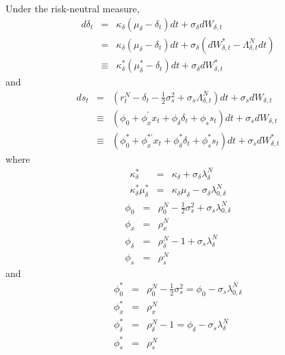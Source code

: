 \documentclass{article}
\begin{document}
Under the risk-neutral measure, 
\begin{eqnarray*}
d\delta _{t} &=&\kappa _{\delta }\left( \mu _{\delta }-\delta _{t}\right)
dt+\sigma _{\delta }dW_{\delta ,t} \\
&=&\kappa _{\delta }\left( \mu _{\delta }-\delta _{t}\right) dt+\sigma
_{\delta }\left( dW_{\delta ,t}^{\ast }-\Lambda _{\delta ,t}^{N}dt\right)  \\
&\equiv &\kappa _{\delta }^{\ast }\left( \mu _{\delta }^{\ast }-\delta
_{t}\right) dt+\sigma _{\delta }dW_{\delta ,t}^{\ast }
\end{eqnarray*}%
and%
\begin{eqnarray*}
ds_{t} &=&\left( r_{t}^{N}-\delta _{t}-\frac{1}{2}\sigma _{s}^{2}+\sigma
_{s}\Lambda _{\delta ,t}^{N}\right) dt+\sigma _{s}dW_{\delta ,t} \\
&\equiv &\left( \phi _{0}+\phi _{x}^{\prime }x_{t}+\phi _{\delta }\delta
_{t}+\phi _{s}s_{t}\right) dt+\sigma _{s}dW_{\delta ,t} \\
&\equiv &\left( \phi _{0}^{\ast }+\phi _{x}^{\ast \prime }x_{t}+\phi
_{\delta }^{\ast }\delta _{t}+\phi _{s}^{\ast }s_{t}\right) dt+\sigma
_{s}dW_{\delta ,t}^{\ast }
\end{eqnarray*}%
where%
\begin{eqnarray*}
\kappa _{\delta }^{\ast } &=&\kappa _{\delta }+\sigma _{\delta }\lambda
_{\delta }^{N} \\
\kappa _{\delta }^{\ast }\mu _{\delta }^{\ast } &=&\kappa _{\delta }\mu
_{\delta }-\sigma _{\delta }\lambda _{0,\delta }^{N}
\end{eqnarray*}%
\begin{eqnarray*}
\phi _{0} &=&\rho _{0}^{N}-\frac{1}{2}\sigma _{s}^{2}+\sigma _{s}\lambda
_{0,\delta }^{N} \\
\phi _{x} &=&\rho _{x}^{N} \\
\phi _{\delta } &=&\rho _{\delta }^{N}-1+\sigma _{s}\lambda _{\delta }^{N} \\
\phi _{s} &=&\rho _{s}^{N}
\end{eqnarray*}%
and%
\begin{eqnarray*}
\phi _{0}^{\ast } &=&\rho _{0}^{N}-\frac{1}{2}\sigma _{s}^{2}=\phi
_{0}-\sigma _{s}\lambda _{0,\delta }^{N} \\
\phi _{x}^{\ast } &=&\rho _{x}^{N} \\
\phi _{\delta }^{\ast } &=&\rho _{\delta }^{N}-1=\phi _{\delta }-\sigma
_{s}\lambda _{\delta }^{N} \\
\phi _{s}^{\ast } &=&\rho _{s}^{N}
\end{eqnarray*}
\end{document}
